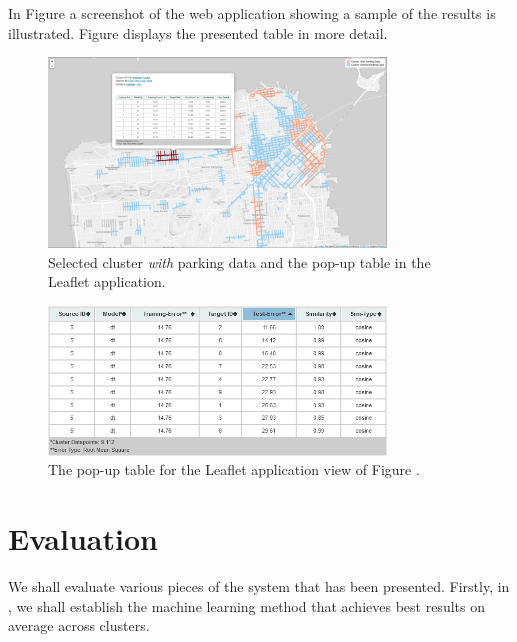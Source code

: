 In Figure  a screenshot of the web application showing a sample of the results is illustrated. Figure  displays the presented table in more detail.

\begin{figure}[!ht]
	\centering
	\includegraphics[width=0.8\textwidth]{graphics/cwith_source_dt_cosine.png}
	\caption{Selected cluster \textit{with} parking data and the pop-up table in the Leaflet application.}
	\label{fig:cwith}
\end{figure}

\begin{figure}[!ht]
	\centering
	\includegraphics[width=0.8\textwidth]{graphics/cwith_source_dt_cosine_table.png}
	\caption{The pop-up table for the Leaflet application view of Figure .}
	\label{fig:cwith_table}
\end{figure}

\section{Evaluation}
We shall evaluate various pieces of the system that has been presented. Firstly, in , we shall establish the machine learning method that achieves best results on average across clusters. 

